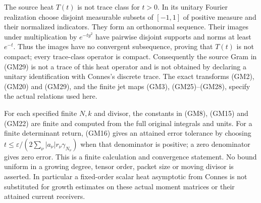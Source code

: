The source heat $T(t)$ is not trace class for $t>0$.  In its unitary
Fourier realization choose disjoint measurable subsets of $[-1,1]$
of positive measure and their normalized indicators.  They form an
orthonormal sequence.  Their images under multiplication by
$e^{-ty^2}$ have pairwise disjoint supports and norms at least
$e^{-t}$.  Thus the images have no convergent subsequence, proving
that $T(t)$ is not compact; every trace-class operator is compact.
Consequently the source Gram in (GM29) is not a trace of this heat
operator and is not obtained by declaring a unitary identification
with Connes's discrete trace.  The exact transforms (GM2), (GM20)
and (GM29), and the finite jet maps (GM3), (GM25)--(GM28), specify
the actual relations used here.

For each specified finite $N,k$ and divisor, the constants in
(GM8), (GM15) and (GM22) are finite and computed from the full
original integrals and units.  For a finite determinant return,
(GM16) gives an attained error tolerance by choosing
$t\leq\varepsilon/(2\sum_\nu|a_\nu|r_\nu\gamma_{N_\nu})$
when that denominator is positive; a zero denominator gives zero
error.  This is a finite calculation and convergence statement.
No bound uniform in a growing degree, tensor order, packet size or
moving divisor is asserted.  In particular a fixed-order scalar
heat asymptotic from Connes is not substituted for growth estimates
on these actual moment matrices or their attained current receivers.
